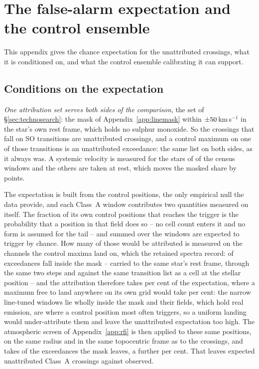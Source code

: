 \section{The false-alarm expectation and the control ensemble}
\label{app:falsealarm}

This appendix gives the chance expectation for the unattributed crossings,
what it is conditioned on, and what the control ensemble calibrating it can
support.

\subsection{Conditions on the expectation}

\emph{One attribution set serves both sides of the comparison}, the set of
\S\ref{sec:technosearch}: the mask of Appendix~\ref{app:linemask} within
$\pm50$\,km\,s$^{-1}$ in the star's own rest frame, which holds no
sulphur monoxide. So the \SoNCrossWord{} crossings that fall on SO transitions
are unattributed crossings, and a control maximum on one of those transitions
is an unattributed exceedance: the same list on both sides, as it always was. A systemic velocity is measured for the stars of
\CeNVsys{} of the census windows and the others are taken at rest, which moves
the masked share by \CeVsysSensPct{} points.

The expectation is built from the control positions, the only empirical null
the data provide, and each Class~A window contributes two quantities
measured on itself. The fraction of its own \NCtrl{} control positions that
reaches the trigger is the probability that a position in that field does so
-- no cell count enters it and no form is assumed for the tail -- and
summed over the windows \CeExpTrig{} are expected to trigger by chance. How
many of those would be attributed is measured on the channels the control
maxima land on, which the retained spectra record: \CeNExcAttr{} of
\CeNExc{} exceedances fall inside the mask -- carried to the same star's rest
frame, through the same two steps and against the same transition list as a
cell at the stellar position -- and the attribution therefore
takes \CeMaskPct{} per cent of the expectation, where a maximum free to
land anywhere on its own grid would take \CeUnifPct{} per cent: the
\CeNFullMask{} narrow line-tuned windows lie wholly inside the mask and
their fields, which hold real emission, are where a control position most
often triggers, so a uniform landing would under-attribute them and leave
the unattributed expectation too high. The atmospheric screen of
Appendix~\ref{app:rfi} is then applied to these same positions, on the same
radius and in the same topocentric frame as to the crossings, and takes
\CeTlCtrlCut{} of the \CeTlCtrlSurv{} exceedances the mask leaves, a further
\CeTlPct{} per cent. That leaves \CeExp{} expected unattributed Class~A
crossings against \CeObs{} observed.

